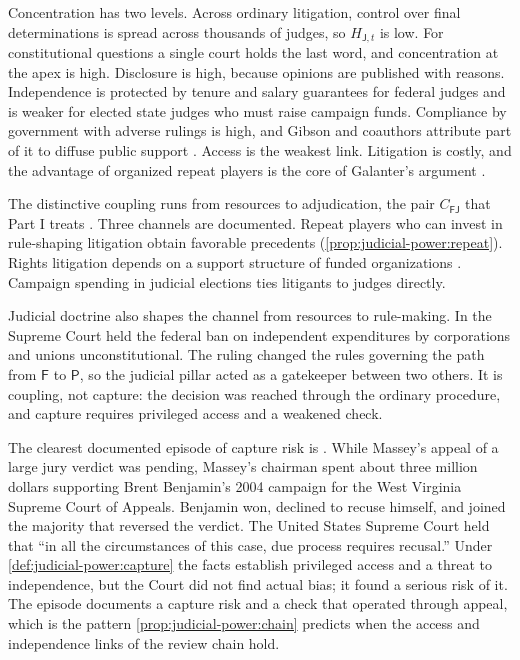 \documentclass[11pt,letterpaper]{article}
\theoremstyle{definition}
\theoremstyle{remark}
\newcommand{\pF}{\mathsf{F}}
\newcommand{\pP}{\mathsf{P}}
\newcommand{\pJ}{\mathsf{J}}
\begin{document}
Concentration has two levels. Across ordinary litigation, control over final determinations is spread across thousands of judges, so $H_{\pJ,t}$ is low. For constitutional questions a single court holds the last word, and concentration at the apex is high. Disclosure is high, because opinions are published with reasons. Independence is protected by tenure and salary guarantees for federal judges and is weaker for elected state judges who must raise campaign funds. Compliance by government with adverse rulings is high, and Gibson and coauthors attribute part of it to diffuse public support \citep{gibson2003}. Access is the weakest link. Litigation is costly, and the advantage of organized repeat players is the core of Galanter's argument \citep{galanter1974}.

The distinctive coupling runs from resources to adjudication, the pair $C_{\pF\pJ}$ that Part I treats \citep{long2026financial}. Three channels are documented. Repeat players who can invest in rule-shaping litigation obtain favorable precedents (\cref{prop:judicial-power:repeat}). Rights litigation depends on a support structure of funded organizations \citep{epp1998}. Campaign spending in judicial elections ties litigants to judges directly.

Judicial doctrine also shapes the channel from resources to rule-making. In \citet{citizensunited2010} the Supreme Court held the federal ban on independent expenditures by corporations and unions unconstitutional. The ruling changed the rules governing the path from $\pF$ to $\pP$, so the judicial pillar acted as a gatekeeper between two others. It is coupling, not capture: the decision was reached through the ordinary procedure, and capture requires privileged access and a weakened check.

The clearest documented episode of capture risk is \citet{caperton2009}. While Massey's appeal of a large jury verdict was pending, Massey's chairman spent about three million dollars supporting Brent Benjamin's 2004 campaign for the West Virginia Supreme Court of Appeals. Benjamin won, declined to recuse himself, and joined the majority that reversed the verdict. The United States Supreme Court held that ``in all the circumstances of this case, due process requires recusal.'' Under \cref{def:judicial-power:capture} the facts establish privileged access and a threat to independence, but the Court did not find actual bias; it found a serious risk of it. The episode documents a capture risk and a check that operated through appeal, which is the pattern \cref{prop:judicial-power:chain} predicts when the access and independence links of the review chain hold.
\end{document}

